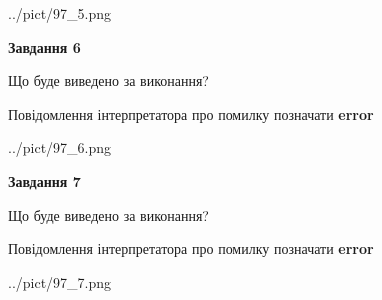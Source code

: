\documentclass[10pt, ukrainian]{article}
\begin{document}
{\begin {large}
\begin{center}
	{../pict/97_5.png}
\end{center}
\newpage

{\begin {center}\textbf{Завдання 6}\end {center}}\par
Що буде виведено за виконання? \par
Повідомлення інтерпретатора про помилку позначати \textbf{error}

\begin{center}
	{../pict/97_6.png}
\end{center}
\newpage

{\begin {center}\textbf{Завдання 7}\end {center}}\par
Що буде виведено за виконання? \par
Повідомлення інтерпретатора про помилку позначати \textbf{error}

\begin{center}
	{../pict/97_7.png}
\end{center}
\newpage

\end {large}}
\end{document}
